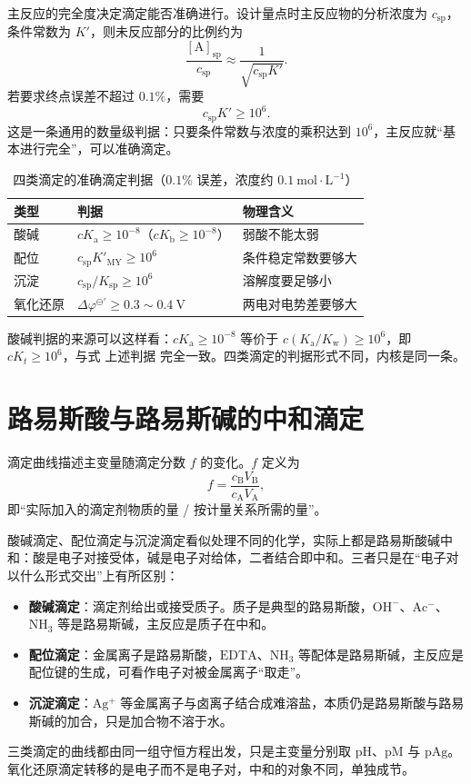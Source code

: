 \documentclass[UTF8]{ctexbook}
\begin{document}
主反应的完全度决定滴定能否准确进行。设计量点时主反应物的分析浓度为 $c_{\mathrm{sp}}$，条件常数为 $K'$，则未反应部分的比例约为
\[
\frac{[\mathrm{A}]_{\mathrm{sp}}}{c_{\mathrm{sp}}}\approx\frac{1}{\sqrt{c_{\mathrm{sp}}K'}}.
\]
若要求终点误差不超过 $0.1\%$，需要
\[
c_{\mathrm{sp}}K'\ge10^{6}.
\]
这是一条通用的数量级判据：只要条件常数与浓度的乘积达到 $10^6$，主反应就“基本进行完全”，可以准确滴定。

\begin{table}[H]
\centering
\caption{四类滴定的准确滴定判据（$0.1\%$ 误差，浓度约 $0.1\ \mathrm{mol\cdot L^{-1}}$）}
\begin{tabular}{p{2.4cm}p{5.4cm}p{5.6cm}}
\toprule
类型 & 判据 & 物理含义 \\
\midrule
酸碱 & $cK_{\mathrm{a}}\ge10^{-8}$（$cK_{\mathrm{b}}\ge10^{-8}$） & 弱酸不能太弱 \\
配位 & $c_{\mathrm{sp}}K'_{\mathrm{MY}}\ge10^{6}$ & 条件稳定常数要够大 \\
沉淀 & $c_{\mathrm{sp}}/K_{\mathrm{sp}}\ge10^{6}$ & 溶解度要足够小 \\
氧化还原 & $\Delta\varphi^{\ominus'}\ge0.3\sim0.4\ \mathrm{V}$ & 两电对电势差要够大 \\
\bottomrule
\end{tabular}
\end{table}

酸碱判据的来源可以这样看：$cK_{\mathrm{a}}\ge10^{-8}$ 等价于 $c(K_{\mathrm{a}}/K_{\mathrm{w}})\ge10^{6}$，即 $cK_t\ge10^{6}$，与式 上述判据 完全一致。四类滴定的判据形式不同，内核是同一条。

\newpage
\section{路易斯酸与路易斯碱的中和滴定}
\label{sec:lewis-titration}

滴定曲线描述主变量随滴定分数 $f$ 的变化。$f$ 定义为
\[
f=\frac{c_{\mathrm{B}}V_{\mathrm{B}}}{c_{\mathrm{A}}V_{\mathrm{A}}},
\]
即“实际加入的滴定剂物质的量 / 按计量关系所需的量”。

酸碱滴定、配位滴定与沉淀滴定看似处理不同的化学，实际上都是路易斯酸碱中和：酸是电子对接受体，碱是电子对给体，二者结合即中和。三者只是在“电子对以什么形式交出”上有所区别：
\begin{itemize}
  \item \textbf{酸碱滴定}：滴定剂给出或接受质子。质子是典型的路易斯酸，$\mathrm{OH^-}$、$\mathrm{Ac^-}$、$\mathrm{NH_3}$ 等是路易斯碱，主反应是质子在中和。
  \item \textbf{配位滴定}：金属离子是路易斯酸，$\mathrm{EDTA}$、$\mathrm{NH_3}$ 等配体是路易斯碱，主反应是配位键的生成，可看作电子对被金属离子“取走”。
  \item \textbf{沉淀滴定}：$\mathrm{Ag^+}$ 等金属离子与卤离子结合成难溶盐，本质仍是路易斯酸与路易斯碱的加合，只是加合物不溶于水。
\end{itemize}
三类滴定的曲线都由同一组守恒方程出发，只是主变量分别取 $\mathrm{pH}$、$\mathrm{pM}$ 与 $\mathrm{pAg}$。氧化还原滴定转移的是电子而不是电子对，中和的对象不同，单独成节。
\end{document}
